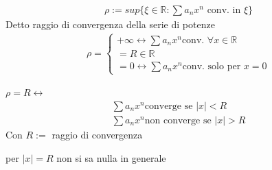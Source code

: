 \documentclass[a4paper, oneside]{article}
\begin{document}
\begin{definition}
  \begin{gather*}
    \boxed{\rho := sup \{\xi \in \mathbb{R} : \sum a_n  x^n \text{ conv. in } \xi \}}
  \end{gather*}
  Detto raggio di convergenza della serie di potenze
  \begin{gather*}
    \rho = \begin{cases}
      +\infty \leftrightarrow \sum a_n x^n \text{conv. } \forall x \in \mathbb{R}\\
      = R \in \mathbb{R} \\
      = 0 \leftrightarrow \sum a_n x^n \text{conv. solo per } x=0
    \end{cases}
  \end{gather*}
\end{definition}


\begin{theorem}
  $\rho = R \leftrightarrow $\\
  \begin{gather*}
    \sum a_n x^n \text{converge se } |x| < R \\
    \sum a_n x^n \text{non converge se } |x| > R
  \end{gather*} 
  Con $R := $ raggio di convergenza
\end{theorem}


\begin{observation}
  per $|x| = R$ non si sa nulla in generale
\end{observation}
\end{document}
